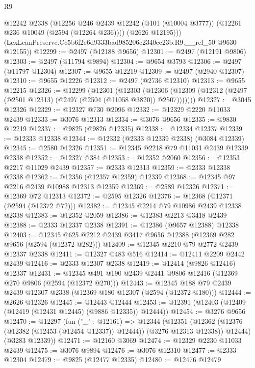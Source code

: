 \begin{lexlean}{R9}
\begin{coremodule}
          @12242
          @2338
          (@12256
            @246
            @2439
            @12242
            (@101 (@10004 @3777))
            (@12261 @236 @10049 (@2594 (@12264 @236))))
          (@2626 @12195)))
      (LexLeanPreserve.Cc5b6f2e6d9333bad985206c2340ec23b.R9.__rel_50 @9630 @12155))
@12299 := @2497 (@12188 @9656)
@12301 := @2497 (@12191 @9806)
@12303 := @2497 (@11794 @9894)
@12304 := @9654 @3793
@12306 := @2497 (@11797 @12304)
@12307 := @9655 @12219
@12309 := @2497 (@2940 @12307)
@12310 := @9655 @12226
@12312 := @2497 (@2736 @12310)
@12313 := @9655 @12215
@12326 := @12299
    (@12301
      (@12303
        (@12306 (@12309 (@12312 (@2497 (@2501 @12313) (@2497 (@2504 (@11058 @3820)) @2507)))))))
@12327 := @3045 @12326
@12329 := @12327 @730 @2096
@12332 := @12329 @2220 @11033 @2439
@12333 := @3076 @12313
@12334 := @3076 @9656
@12335 := @9830 @12219
@12337 := @9825 (@9826 @12335)
@12338 := @12334 @12337
@12339 := @12333 @12338
@12344 := @12332 (@2333 @12339 @2338) (@3084 @12339)
@12345 := @2580 @12326
@12351 := @12345 @2218 @79 @11031 @2439 @12339 @2338
@12352 := @12327 @384
@12353 := @12352 @2060
@12356 := @12353 @2217 @11029 @2439
@12357 := @2333 @12313
@12359 := @2333 @12338 @2338
@12362 := @12356 (@12357 @12359) @12339
@12368 := @12345 @97 @2216 @2439 @10988 @12313 @12359
@12369 := @2589 @12326
@12371 := @12369 @72 @12313
@12372 := @2595 @12326
@12376 := @12368 (@12371 (@2594 (@12372 @72)))
@12382 := @12345 @2214 @79 @10986 @2439 @12338 @2338
@12383 := @12352 @2059
@12386 := @12383 @2213 @3418 @2439
@12388 := @2333 @12337 @2338
@12391 := @12386 (@9657 @12388) @12338
@12403 := @12345 @625 @2212 @2439 @3417 @9656 @12388 (@12369 @282 @9656 (@2594 (@12372 @282)))
@12409 := @12345 @2210 @79 @2772 @2439 @12337 @2338
@12411 := @12327 @483 @516
@12414 := @12411 @2209 @2442 @2439
@12416 := @2333 @12307 @2338
@12419 := @12414 (@9826 @12416) @12337
@12431 := @12345 @491 @190 @2439 @2441 @9806 @12416 (@12369 @270 @9806 (@2594 (@12372 @270)))
@12443 := @12345 @188 @79 @2439 @2439 @12307 @2338 (@12369 @180 @12307 (@2594 (@12372 @180)))
@12444 := @2626 @12326
@12445 := @12443 @12444
@12453 := @12391 (@12403 (@12409 (@12419 (@12431 @12445) (@9886 @12335)) @12444))
@12454 := @3276 @9656
@12470 := @12297
    (fun ("_" : @12161) =>
    @12344
      (@12351
        (@12362 (@12376 (@12382 (@12453 (@12454 @12337)) @12444)) (@3276 @12313 @12338))
        @12444)
      (@3283 @12339))
@12471 := @12160 @3069
@12474 := @12329 @2230 @11033 @2439
@12475 := @3076 @9894
@12476 := @3076 @12310
@12477 := @2333 @12304
@12479 := @9825 (@12477 @12335)
@12480 := @12476 @12479

\end{coremodule}
\end{lexlean}
